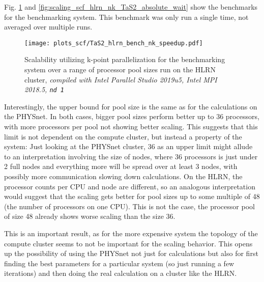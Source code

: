 \documentclass[main.tex]{subfiles}
\begin{document}
Fig. \ref{fig:scaling_scf_hlrn_nk_TaS2_speedup} and \ref{fig:scaling_scf_hlrn_nk_TaS2_absolute_wait} show the benchmarks for the \TaS benchmarking system.
This benchmark was only run a single time, not averaged over multiple runs.

\begin{figure}[ht!]
\centering
\texttt{[image: plots\_scf/TaS2\_hlrn\_bench\_nk\_speedup.pdf]}
\caption{Scalability utilizing k-point parallelization for the \TaS benchmarking system over a range of processor pool sizes run on the HLRN cluster, \emph{\QE compiled with Intel Parallel Studio 2019u5, Intel MPI 2018.5, \texttt{nd 1}}}
\label{fig:scaling_scf_hlrn_nk_TaS2_speedup}
\end{figure}
Interestingly, the upper bound for pool size is the same as for the calculations on the PHYSnet.
In both cases, bigger pool sizes perform better up to 36 processors, with more processors per pool not showing better scaling.
This suggests that this limit is not dependent on the compute cluster, but instead a property of the \TaS system:
Just looking at the PHYSnet cluster, 36 as an upper limit might allude to an interpretation involving the size of nodes, where 36 processors is just under 2 full nodes and everything more will be spread over at least 3 nodes, with possibly more communication slowing down calculations.
On the HLRN, the processor counts per CPU and node are different, so an analogous interpretation would suggest that the scaling gets better for pool sizes up to some multiple of 48 (the number of processors on one CPU).
This is not the case, the processor pool of size 48 already shows worse scaling than the size 36.

This is an important result, as for the more expensive \TaS system the topology of the compute cluster seems to not be important for the scaling behavior.
This opens up the possibility of using the PHYSnet not just for calculations but also for first finding the best parameters for a particular system (so just running a few iterations) and then doing the real calculation on a cluster like the HLRN.
\end{document}
